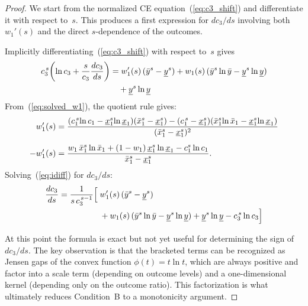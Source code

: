 \begin{proof}
We start from the normalized CE equation~(\ref{eq:c3_shift}) and
differentiate it with respect to~$s$. This produces a first expression for
$dc_3/ds$ involving both $w_1'(s)$ and the direct $s$-dependence of the
outcomes.

Implicitly differentiating~(\ref{eq:c3_shift}) with respect to~$s$ gives
\begin{align}
  \label{eq:idiff}
  \begin{split}
  c_3^{\,s}\!\left(\ln c_3 + \frac{s}{c_3}\frac{dc_3}{ds}\right) &=
    w_1'(s)\,(\bar{y}^s - \underline{y}^s)
    + w_1(s)\,(\bar{y}^s \ln\bar{y} - \underline{y}^s \ln\underline{y}) \\
    &\quad + \underline{y}^s \ln\underline{y}
  \end{split}
\end{align}
From~(\ref{eq:solved_w1}), the quotient rule gives:
\begin{align}
  w_1'(s) &= \frac{(c_1^{\,s}\!\ln c_1 - \underline{x}_1^s\!\ln\underline{x}_1)(\bar{x}_1^s - \underline{x}_1^s)
    - (c_1^{\,s} - \underline{x}_1^s)(\bar{x}_1^s\!\ln\bar{x}_1 - \underline{x}_1^s\!\ln\underline{x}_1)}
    {(\bar{x}_1^s - \underline{x}_1^s)^2} \notag \\[0.5em]
  \label{eq:dw1ds}
  -w_1'(s) &= \frac{w_1\,\bar{x}_1^s \ln \bar{x}_1
    + (1-w_1)\,\underline{x}_1^s \ln \underline{x}_1
    - c_1^s \ln c_1}{\bar{x}_1^s - \underline{x}_1^s}.
\end{align}
Solving~(\ref{eq:idiff}) for $dc_3/ds$:
\begin{align}
  \label{eq:dc3ds}
  \frac{dc_3}{ds} = \frac{1}{s\, c_3^{\,s-1}}\Bigl[&\;
    w_1'(s)\,(\bar{y}^s - \underline{y}^s) \notag \\
    &\; + w_1(s)\,(\bar{y}^s \ln\bar{y} - \underline{y}^s \ln\underline{y})
    + \underline{y}^s \ln\underline{y} - c_3^{\,s} \ln c_3
  \Bigr]
\end{align}

At this point the formula is exact but not yet useful for determining the sign
of $dc_3/ds$. The key observation is that the bracketed terms can be recognized
as Jensen gaps of the convex function $\phi(t) = t\ln t$, which are always
positive and factor into a scale term (depending on outcome levels) and a
one-dimensional kernel (depending only on the outcome ratio). This factorization
is what ultimately reduces Condition~B to a monotonicity argument.


\end{proof}
